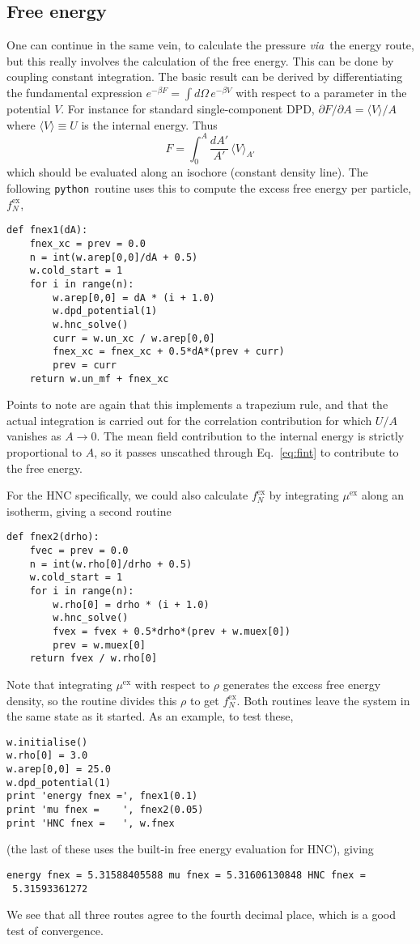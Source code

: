 \documentclass[12pt,a4paper]{article}
\newcommand{\latin}[1]{\emph{#1}}
\newcommand{\via}{\latin{via}}
\newcommand{\myex}{^{\mathrm{ex}}}
\newcommand{\muex}{\mu\myex}
\newcommand{\fNex}{f_N\myex}
\newcommand{\Eqref}[1]{Eq.~\eqref{#1}}
\newcommand{\python}{{\tt python}}
\begin{document}
\subsection{Free energy}
\label{sec:feng}
%
One can continue in the same vein, to calculate the pressure \via\ the
energy route, but this really involves the calculation of the free
energy.  This can be done by coupling constant integration.  The basic
result can be derived by differentiating the fundamental expression
$e^{-\beta F} = \int\!d\Omega\,e^{-\beta V}$ with respect to a
parameter in the potential $V$.  For instance for standard
single-component DPD, ${\partial F}/{\partial A}={\langle
  V\rangle}/{A}$ where $\langle V\rangle\equiv U$ is the internal
energy.  Thus
%
\begin{equation}
F=\int_0^A\frac{dA'}{A'}\,\langle V\rangle_{A'}
\label{eq:fint}
\end{equation}
%
which should be evaluated along an isochore (constant density line).
The following \python\ routine uses this to compute the excess free
energy per particle, $\fNex$,
%
\begin{verbatim}
def fnex1(dA):
    fnex_xc = prev = 0.0
    n = int(w.arep[0,0]/dA + 0.5)
    w.cold_start = 1
    for i in range(n):
        w.arep[0,0] = dA * (i + 1.0)
        w.dpd_potential(1)
        w.hnc_solve()
        curr = w.un_xc / w.arep[0,0]
        fnex_xc = fnex_xc + 0.5*dA*(prev + curr)
        prev = curr
    return w.un_mf + fnex_xc
\end{verbatim}
%
Points to note are again that this implements a trapezium rule, and
that the actual integration is carried out for the correlation
contribution for which $U/A$ vanishes as $A\to0$.  The mean field
contribution to the internal energy is strictly proportional to $A$,
so it passes unscathed through \Eqref{eq:fint} to contribute
to the free energy.

For the HNC specifically, we could also calculate $\fNex$ by integrating
$\muex$ along an isotherm, giving a second routine
%
\begin{verbatim}
def fnex2(drho):
    fvec = prev = 0.0
    n = int(w.rho[0]/drho + 0.5)
    w.cold_start = 1
    for i in range(n):
        w.rho[0] = drho * (i + 1.0)
        w.hnc_solve()
        fvex = fvex + 0.5*drho*(prev + w.muex[0])
        prev = w.muex[0]
    return fvex / w.rho[0]
\end{verbatim}
%
Note that integrating $\muex$ with respect to $\rho$ generates the
excess free energy density, so the routine divides this $\rho$ to get
$\fNex$.  Both routines leave the system in the same state as it
started.  As an example, to test these,
%
\begin{verbatim}
w.initialise()
w.rho[0] = 3.0
w.arep[0,0] = 25.0
w.dpd_potential(1)
print 'energy fnex =', fnex1(0.1)
print 'mu fnex =    ', fnex2(0.05)
print 'HNC fnex =   ', w.fnex
\end{verbatim}
%
(the last of these uses the built-in free energy evaluation for HNC), giving
%
\begin{verbatim}
energy fnex = 5.31588405588 mu fnex = 5.31606130848 HNC fnex =
 5.31593361272
\end{verbatim}
%
We see that all three routes agree to the fourth decimal place,
which is a good test of convergence.
\end{document}
